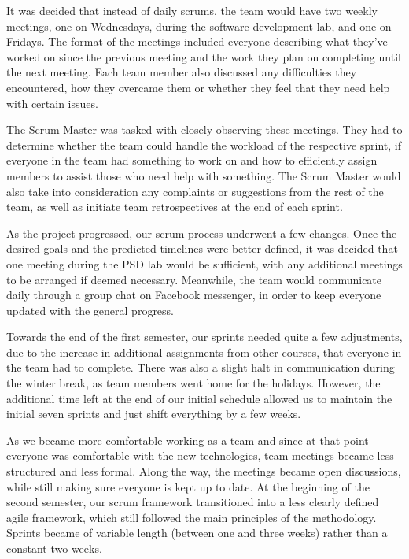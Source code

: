 \documentclass{l3proj}
\begin{document}
 It was decided that instead of daily scrums, the team would have two weekly
  meetings, one on Wednesdays, during the software development lab, and one on
  Fridays. The format of the meetings included everyone describing what they've
  worked on since the previous meeting and the work they plan on completing
  until the next meeting. Each team member also discussed any difficulties
  they encountered, how they overcame them or whether they feel that they
  need help with certain issues.

 The Scrum Master was tasked with closely observing these meetings. They had
  to determine whether the team could handle the workload of the respective
  sprint, if everyone in the team had something to work on and how to efficiently
  assign members to assist those who need help with something. The Scrum
  Master would also take into consideration any complaints or suggestions from
  the rest of the team, as well as initiate team retrospectives at the end of
  each sprint.

 As the project progressed, our scrum process underwent a few changes. Once
 the desired goals and the predicted timelines were better defined, it was
 decided that one meeting during the PSD lab would be sufficient, with any
 additional meetings to be arranged if deemed necessary. Meanwhile, the team
 would communicate daily through a group chat on Facebook messenger, in order
 to keep everyone updated with the general progress.

Towards the end of the first semester, our sprints needed quite a few
 adjustments, due to the increase in additional assignments from other
 courses, that everyone in the team had to complete. There was also a
 slight halt in communication during the winter break, as team members
 went home for the holidays. However, the additional time left at the
 end of our initial schedule allowed us to maintain the initial seven
 sprints and just shift everything by a few weeks.

As we became more comfortable working as a team and since at that
 point everyone was comfortable with the new technologies, team
 meetings became less structured and less formal. Along the way,
 the meetings became open discussions, while still making sure
 everyone is kept up to date. At the beginning of the second
 semester, our scrum framework transitioned into a less clearly
 defined agile framework, which still followed the main principles
 of the methodology. Sprints became of variable length (between
 one and three weeks) rather than a constant two weeks.
\end{document}
